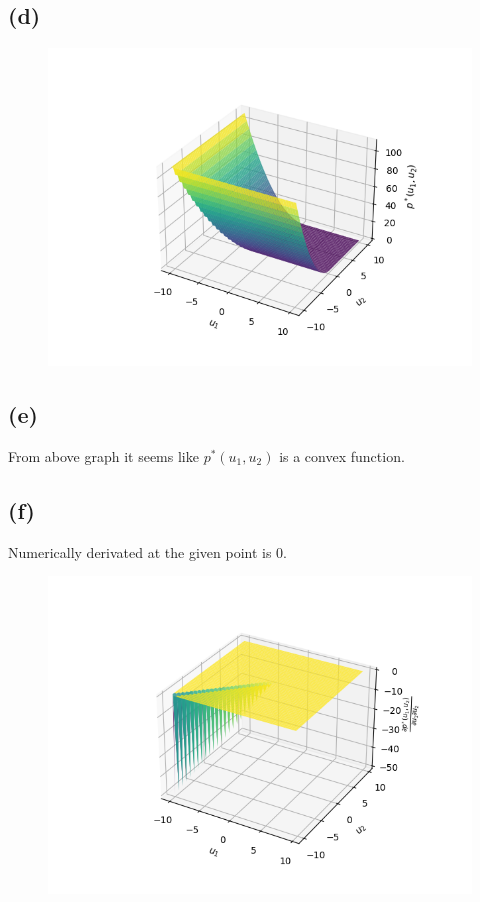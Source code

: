 \documentclass{article}
\begin{document}
\subsection*{(d)}
\begin{figure}[H]
	\includegraphics[scale=1]{./figs/p.png}
\end{figure}
\subsection*{(e)}
From above graph it seems like $p^*(u_1, u_2)$ is a convex function.
\subsection*{(f)}
Numerically derivated at the given point is 0.
\begin{figure}[H]
	\includegraphics[scale=1]{./figs/p_dash.png}
\end{figure}
\end{document}
